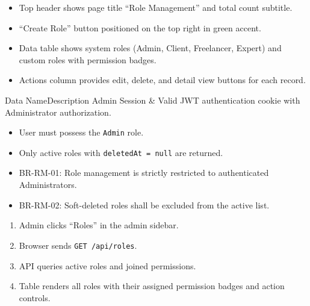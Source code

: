 \begin{itemize}[leftmargin=1.6em,topsep=3pt,itemsep=2pt,parsep=0pt,label=$\bullet$]
    \item Top header shows page title ``Role Management'' and total count subtitle.
    \item ``Create Role'' button positioned on the top right in green accent.
    \item Data table shows system roles (Admin, Client, Freelancer, Expert) and custom roles with permission badges.
    \item Actions column provides edit, delete, and detail view buttons for each record.
\end{itemize}


\begin{specdatatable}{Data Name}{Description}
Admin Session & Valid JWT authentication cookie with Administrator authorization.\\ \hline
\end{specdatatable}

\begin{itemize}[leftmargin=1.6em,topsep=3pt,itemsep=2pt,parsep=0pt,label=$\bullet$]
    \item User must possess the \texttt{Admin} role.
    \item Only active roles with \texttt{deletedAt = null} are returned.
\end{itemize}

\begin{itemize}[leftmargin=1.6em,topsep=3pt,itemsep=2pt,parsep=0pt,label=$\bullet$]\brrulelist
    \item BR-RM-01: Role management is strictly restricted to authenticated Administrators.
    \item BR-RM-02: Soft-deleted roles shall be excluded from the active list.
\end{itemize}

\begin{enumerate}[leftmargin=1.8em,topsep=3pt,itemsep=2pt,parsep=0pt]
    \item Admin clicks ``Roles'' in the admin sidebar.
    \item Browser sends \texttt{GET /api/roles}.
    \item API queries active roles and joined permissions.
    \item Table renders all roles with their assigned permission badges and action controls.
\end{enumerate}

